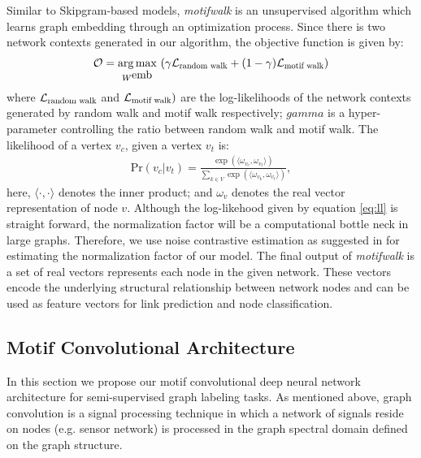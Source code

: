 \documentclass{article}
\DeclareMathOperator*{\argmax}{arg\,max}
\theoremstyle{definition}
\begin{document}
Similar to Skipgram-based models, \emph{motifwalk} is an unsupervised algorithm which 
learns graph embedding through an optimization process. Since there is two 
network contexts generated in our algorithm, the objective function is given by:
\begin{equation} \label{eq:mloss}
\begin{aligned}
&\mathcal{O} = \argmax_{W^{\mbox{emb}}}\ (\gamma \mathcal{L}_{\scalebox{0.75}{random walk}} + (1-\gamma) \mathcal{L}_{\scalebox{0.75}{motif walk}}) \\
\end{aligned}
\end{equation}
where $\mathcal{L}_{\scalebox{0.75}{random walk}}$ and $\mathcal{L}_{\scalebox{0.75}{motif walk}})$
are the log-likelihoods of the network contexts generated by
random walk and motif walk respectively; $gamma$ is a hyper-parameter
controlling the ratio between random walk and motif walk. The likelihood
of a vertex $v_c$, given a vertex $v_t$ is:
\begin{equation} \label{eq:ll}
\begin{aligned}
    \mbox{Pr} (v_c | v_t) = \frac{\exp{( \langle \omega_{v_c} ,  \omega_{v_t} \rangle )}}{\sum_{k \in V} \exp{( \langle \omega_{v_k} ,  \omega_{v_t} \rangle )}},
\end{aligned}
\end{equation}
here, $\langle \cdot , \cdot \rangle$ denotes the inner product; and $\omega_v$ denotes
the real vector representation of node $v$. Although the log-likehood given
by equation \ref{eq:ll} is straight forward, the normalization factor will be
a computational bottle neck in large graphs. Therefore, we use noise contrastive
estimation as suggested in \cite{skipgram,node2vec} for estimating the normalization
factor of our model. The final output of \emph{motifwalk} is a set of real vectors
represents each node in the given network. These vectors encode the underlying
structural relationship between network nodes and can be used as feature vectors
for link prediction and node classification.

\subsection{Motif Convolutional Architecture}

In this section we propose our motif convolutional deep
neural network architecture for semi-supervised graph labeling
tasks. As mentioned above, graph convolution is a signal processing technique in which
a network of signals reside on nodes (e.g. sensor network) is
processed in the graph spectral domain defined on the graph structure.
\end{document}
